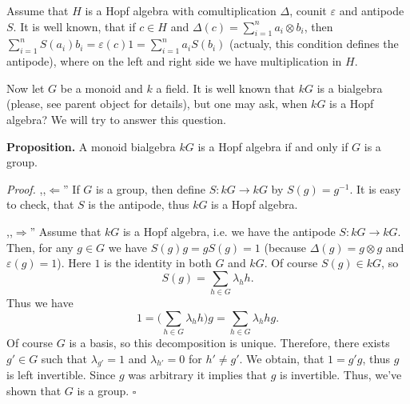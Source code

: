 \documentclass[12pt]{article}
\begin{document}
Assume that $H$ is a Hopf algebra with comultiplication $\Delta$, counit $\varepsilon$ and antipode $S$. It is well known, that if $c\in H$ and $\Delta(c)=\sum\limits_{i=1}^{n}a_i\otimes b_i$, then $\sum\limits_{i=1}^{n}S(a_i)b_i=\varepsilon(c)1=\sum\limits_{i=1}^{n}a_iS(b_i)$ (actualy, this condition defines the antipode), where on the left and right side we have multiplication in $H$.

Now let $G$ be a monoid and $k$ a field. It is well known that $kG$ is a bialgebra (please, see parent object for details), but one may ask, when $kG$ is a Hopf algebra? We will try to answer this question.

\textbf{Proposition.} A monoid bialgebra $kG$ is a Hopf algebra if and only if $G$ is a group.

\textit{Proof.} ,,$\Leftarrow$'' If $G$ is a group, then define $S:kG\to kG$ by $S(g)=g^{-1}$. It is easy to check, that $S$ is the antipode, thus $kG$ is a Hopf algebra.

,,$\Rightarrow$'' Assume that $kG$ is a Hopf algebra, i.e. we have the antipode $S:kG\to kG$. Then, for any $g\in G$ we have $S(g)g=gS(g)=1$ (because $\Delta(g)=g\otimes g$ and $\varepsilon(g)=1$). Here $1$ is the identity in both $G$ and $kG$. Of course $S(g)\in kG$, so
$$S(g)=\sum_{h\in G}\lambda_h h.$$
Thus we have 
$$1=\big(\sum_{h\in G}\lambda_h h\big)g=\sum_{h\in G}\lambda_h hg.$$
Of course $G$ is a basis, so this decomposition is unique. Therefore, there exists $g'\in G$ such that $\lambda_{g'}=1$ and $\lambda_{h'}=0$ for $h'\neq g'$. We obtain, that $1=g'g$, thus $g$ is left invertible. Since $g$ was arbitrary it implies that $g$ is invertible. Thus, we've shown that $G$ is a group. $\square$
\end{document}
